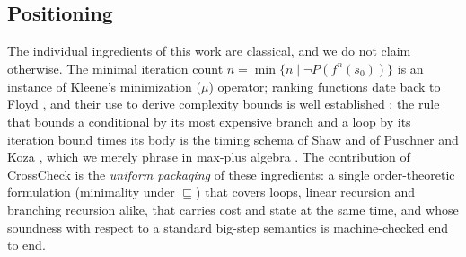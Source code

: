\documentclass[oneside,english]{amsart}
\numberwithin{equation}{section}
\numberwithin{figure}{section}
\theoremstyle{plain}
\theoremstyle{definition}
\theoremstyle{plain}
\theoremstyle{remark}
\theoremstyle{plain}
\theoremstyle{definition}
\theoremstyle{plain}
\theoremstyle{remark}
\begin{document}
\subsection*{Positioning}
The individual ingredients of this work are classical, and we do not claim otherwise. The minimal iteration count
$\bar{n} = \min\{n \mid \neg P(f^n(s_0))\}$ is an instance of Kleene's minimization ($\mu$) operator; ranking functions
date back to Floyd \cite{floyd1967assigning}, and their use to derive complexity bounds is well established
\cite{alias2010multi,gulwani2009speed,sinn2014complexity}; the rule that bounds a conditional by its most expensive
branch and a loop by its iteration bound times its body is the timing schema of Shaw and of Puschner and Koza
\cite{shaw1989reasoning,puschner1989calculating}, which we merely phrase in max-plus algebra \cite{baccelli1992synchronization}. The contribution of CrossCheck is the \emph{uniform packaging} of these
ingredients: a single order-theoretic formulation (minimality under $\sqsubseteq$) that covers loops, linear recursion
and branching recursion alike, that carries cost and state at the same time, and whose soundness with respect to a
standard big-step semantics is machine-checked end to end.
\end{document}
